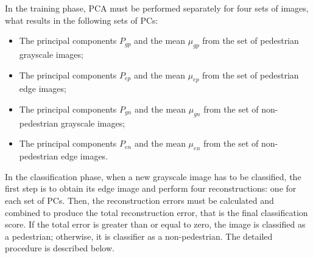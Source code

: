 \documentclass[10pt, conference, compsocconf]{IEEEtran}
\begin{document}
In the training phase, PCA must be performed separately for four sets of images, what results in the following sets of PCs:

\begin{itemize}
	\item The principal components $P_{gp}$ and the mean $\mu_{gp}$ from the set of pedestrian grayscale images;
	\item The principal components $P_{ep}$ and the mean $\mu_{ep}$ from the set of pedestrian edge images;
	\item The principal components $P_{gn}$ and the mean $\mu_{gn}$ from the set of non-pedestrian grayscale images;
	\item The principal components $P_{en}$ and the mean $\mu_{en}$ from the set of non-pedestrian edge images.
\end{itemize}

In the classification phase, when a new grayscale image has to be classified, the first step is to obtain its edge image and perform four reconstructions: one for each set of PCs. Then, the reconstruction errors must be calculated and combined to produce the total reconstruction error, that is the final classification score. If the total error is greater than or equal to zero, the image is classified as a pedestrian; otherwise, it is classifier as a non-pedestrian. The detailed procedure is described below.
\end{document}
